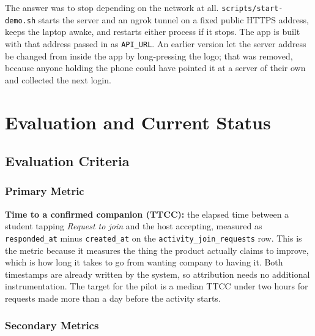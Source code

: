 \documentclass{tietreport}
\begin{document}
The answer was to stop depending on the network at all. \texttt{scripts/start-demo.sh}
starts the server and an ngrok tunnel on a fixed public HTTPS address, keeps the laptop
awake, and restarts either process if it stops. The app is built with that address passed
in as \texttt{API\_URL}. An earlier version let the server address be changed from inside
the app by long-pressing the logo; that was removed, because anyone holding the phone could
have pointed it at a server of their own and collected the next login.



\chapter{Evaluation and Current Status}

\section{Evaluation Criteria}

\subsection{Primary Metric}

\textbf{Time to a confirmed companion (TTCC):} the elapsed time between a student
tapping \emph{Request to join} and the host accepting, measured as
\texttt{responded\_at} minus \texttt{created\_at} on the \texttt{activity\_join\_requests}
row. This is the metric because it measures the thing the product actually claims to
improve, which is how long it takes to go from wanting company to having it. Both
timestamps are already written by the system, so attribution needs no additional
instrumentation. The target for the pilot is a median TTCC under two hours for requests
made more than a day before the activity starts.

\subsection{Secondary Metrics}
\end{document}
